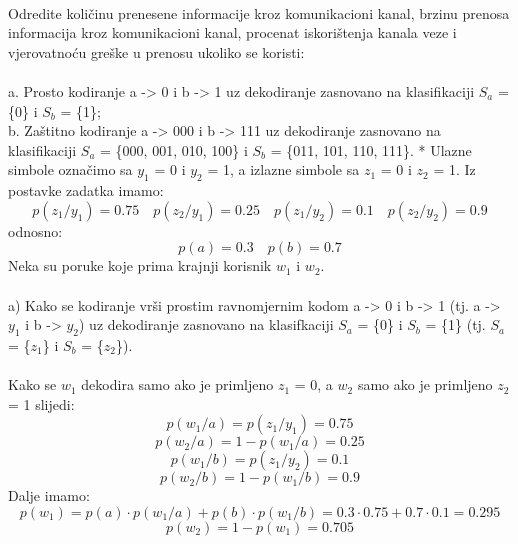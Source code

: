 \documentclass[12pt]{article}
\begin{document}
\begin{enumerate}
\\
Odredite količinu prenesene informacije kroz komunikacioni kanal, brzinu prenosa informacija kroz komunikacioni kanal, procenat iskorištenja kanala veze i vjerovatnoću greške u prenosu ukoliko se koristi: \\
\\
a. Prosto kodiranje a -> 0 i b -> 1 uz dekodiranje zasnovano na klasifikaciji $S_a$ = \{0\} i $S_b$ = \{1\}; \\
b. Zaštitno kodiranje a -> 000 i b -> 111 uz dekodiranje zasnovano na klasifikaciji $S_a$ = \{000, 001, 010, 100\} i $S_b$ = \{011, 101, 110, 111\}.
\newpage
* Ulazne simbole označimo sa $y_1$ = 0 i $y_2$ = 1, a izlazne simbole sa $z_1$ = 0 i
$z_2$ = 1. Iz postavke zadatka imamo:
\begin{equation*}
    p(z_1/y_1) = 0.75 \quad p(z_2/y_1) = 0.25 \quad p(z_1/y_2) = 0.1 \quad p(z_2/y_2) = 0.9
\end{equation*}
odnosno:
\begin{equation*}
    p(a) = 0.3 \quad p(b) = 0.7
\end{equation*}
Neka su poruke koje prima krajnji korisnik $w_1$ i $w_2$. \\
\\
a) Kako se kodiranje vrši prostim ravnomjernim kodom a -> 0 i b -> 1 (tj. a -> $y_1$ i b -> $y_2$) uz dekodiranje zasnovano na klasifkaciji $S_a$ = \{0\} i
$S_b$ = \{1\} (tj. $S_a$ = \{$z_1$\} i $S_b$ = \{$z_2$\}).\\
\\
Kako se $w_1$ dekodira samo ako je primljeno $z_1$ = 0, a $w_2$ samo ako je
primljeno $z_2$ = 1 slijedi:
\begin{equation*}
    p(w_1/a) = p(z_1/y_1) = 0.75
\end{equation*}
\begin{equation*}
    p(w_2/a) = 1 - p(w_1/a) = 0.25
\end{equation*}
\begin{equation*}
    p(w_1/b) = p(z_1/y_2) = 0.1
\end{equation*}
\begin{equation*}
    p(w_2/b) = 1 - p(w_1/b) = 0.9
\end{equation*}
Dalje imamo:
\begin{equation*}
    p(w_1) = p(a) \cdot p(w_1/a) + p(b) \cdot p(w_1/b) = 0.3 \cdot 0.75 + 0.7 \cdot  0.1 = 0.295
\end{equation*}
\begin{equation*}
    p(w_2) = 1 - p(w_1) =  0.705
\end{equation*}

\end{enumerate}
\end{document}
